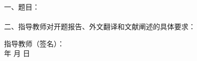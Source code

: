 
\newpage
\thispagestyle{empty}

\begin{tabbing}
	\hspace{5mm}\songti\wuhao 一、题目：\underline{\makebox[12cm]{\tjutitlec}}
	\\ \\ 
	\hspace{5mm}\songti \wuhao
	二、指导教师对开题报告、外文翻译和文献阐述的具体要求：
\end{tabbing}

\vspace{140mm}

\begin{tabbing}
	\hspace{80mm}\songti \xiaosi 指导教师（签名）：
	\\
	\hspace{90mm}\songti \xiaosi 年 \hspace{5mm}
	\songti \xiaosi 月 \hspace{5mm}\songti \xiaosi 日
\end{tabbing}

